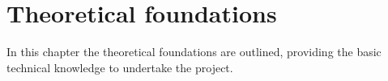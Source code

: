 %
\chapter{Theoretical foundations}
\label{cha:theor-found}
In this chapter the theoretical foundations are outlined,
providing the basic technical knowledge to undertake the project.
% 
















%
